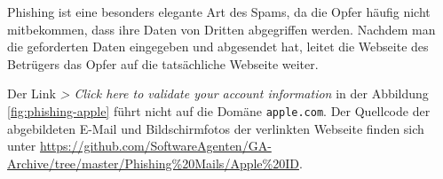 Phishing ist eine besonders elegante Art des Spams, da die Opfer häufig nicht
mitbekommen, dass ihre Daten von Dritten abgegriffen werden. Nachdem man die
geforderten Daten eingegeben und abgesendet hat, leitet die Webseite des
Betrügers das Opfer auf die tatsächliche Webseite weiter.

Der Link \emph{> Click here to validate your account information} in der
Abbildung \ref{fig:phishing-apple} führt nicht auf die Domäne
\texttt{apple.com}. Der Quellcode der abgebildeten E-Mail und Bildschirmfotos
der verlinkten Webseite finden sich unter
\url{https://github.com/SoftwareAgenten/GA-Archive/tree/master/Phishing%20Mails/Apple\%20ID}.
